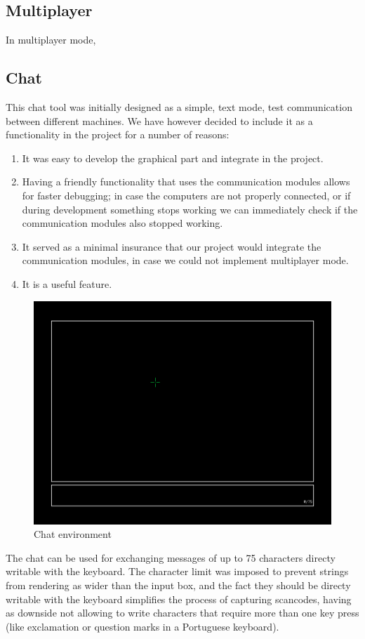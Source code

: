 \documentclass{article}
\theoremstyle{remark}
\begin{document}
\subsection{Multiplayer}
In multiplayer mode, 
\pagebreak
\subsection{Chat}
This chat tool was initially designed as a simple, text mode, test communication between different machines. We have however decided to include it as a functionality in the project for a number of reasons:
\begin{enumerate}
	\item It was easy to develop the graphical part and integrate in the project.
	\item Having a friendly functionality that uses the communication modules allows for faster debugging; in case the computers are not properly connected, or if during development something stops working we can immediately check if the communication modules also stopped working.
	\item It served as a minimal insurance that our project would integrate the communication modules, in case we could not implement multiplayer mode.
	\item It is a useful feature.
\end{enumerate}
\begin{figure}[H] \centering
	\includegraphics[scale=0.45]{chat01}
	\caption{Chat environment}
\end{figure}
The chat can be used for exchanging messages of up to 75 characters directy writable with the keyboard. The character limit was imposed to prevent strings from rendering as wider than the input box, and the fact they should be directy writable with the keyboard simplifies the process of capturing scancodes, having as downside not allowing to write characters that require more than one key press (like exclamation or question marks in a Portuguese keyboard). \par
\end{document}
